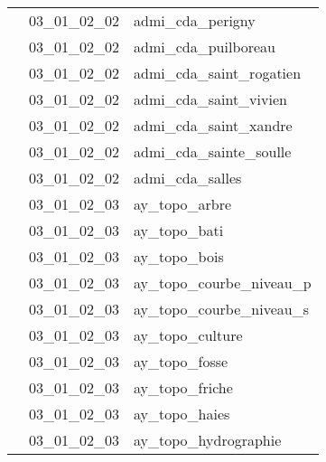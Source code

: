 \documentclass[12pt,titlepage]{book}
\begin{document}
\begin{supertabular}{|p{10cm}|c|p{15cm}|}
                    & 03\_01\_02\_02 & admi\_cda\_perigny\\


                    & 03\_01\_02\_02 & admi\_cda\_puilboreau\\


                    & 03\_01\_02\_02 & admi\_cda\_saint\_rogatien\\


                    & 03\_01\_02\_02 & admi\_cda\_saint\_vivien\\


                    & 03\_01\_02\_02 & admi\_cda\_saint\_xandre\\


                    & 03\_01\_02\_02 & admi\_cda\_sainte\_soulle\\


                    & 03\_01\_02\_02 & admi\_cda\_salles\\


                    & 03\_01\_02\_03 & ay\_topo\_arbre\\


                    & 03\_01\_02\_03 & ay\_topo\_bati\\


                    & 03\_01\_02\_03 & ay\_topo\_bois\\


                    & 03\_01\_02\_03 & ay\_topo\_courbe\_niveau\_p\\


                    & 03\_01\_02\_03 & ay\_topo\_courbe\_niveau\_s\\


                    & 03\_01\_02\_03 & ay\_topo\_culture\\


                    & 03\_01\_02\_03 & ay\_topo\_fosse\\


                    & 03\_01\_02\_03 & ay\_topo\_friche\\


                    & 03\_01\_02\_03 & ay\_topo\_haies\\


                    & 03\_01\_02\_03 & ay\_topo\_hydrographie\\



\end{supertabular}
\end{document}
